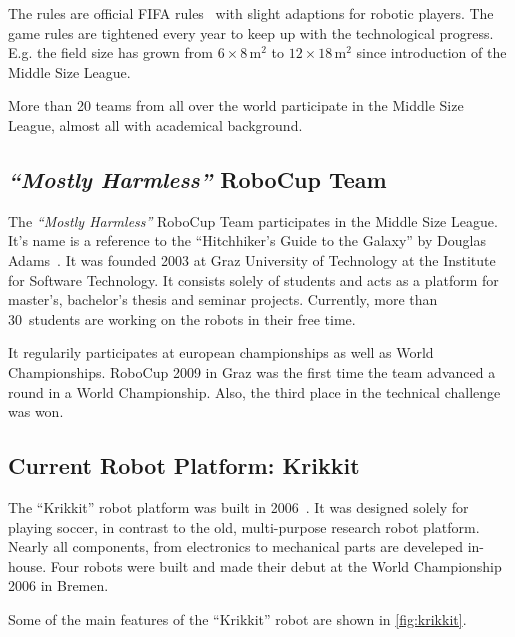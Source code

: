\documentclass[12pt,a4paper]{article}
\newcommand{\MH}{\emph{``Mostly Harmless''} RoboCup Team\xspace}
\newcommand{\MSL}{Middle Size League\xspace}
\begin{document}
The rules are official FIFA rules~\cite{msl-rules} with slight adaptions for robotic players.
The game rules are tightened every year to keep up with the technological progress. 
E.g. the field size has grown from $6\times8$\,m$^2$ to $12\times18$\,m$^2$ since introduction of the \MSL.

More than 20 teams from all over the world participate in the \MSL, almost all with academical background.


\subsection{\MH}

The \MH participates in the \MSL. 
It's name is a reference to the ``Hitchhiker's Guide to the Galaxy'' by Douglas Adams~\cite{h2g2}.
It was founded 2003 at Graz University of Technology at the Institute for Software Technology. 
It consists solely of students and acts as a platform for master's, bachelor's thesis and seminar projects.
Currently, more than 30~students are working on the robots in their free time.

It regularily participates at european championships as well as World Championships.
RoboCup 2009 in Graz was the first time the team advanced a round in a World Championship. 
Also, the third place in the technical challenge was won.




\subsection{Current Robot Platform: Krikkit}

The ``Krikkit'' robot platform was built in 2006~\cite{}. 
It was designed solely for playing soccer, in contrast to the old, multi-purpose research robot platform.
Nearly all components, from electronics to mechanical parts are develeped in-house.
Four robots were built and made their debut at the World Championship 2006 in Bremen.

Some of the main features of the ``Krikkit'' robot are shown in \autoref{fig:krikkit}.
\end{document}
